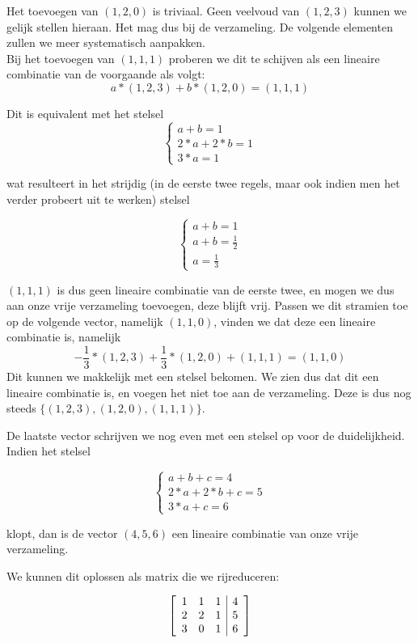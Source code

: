 \documentclass[lineaire_algebra_oplossingen.tex]{subfiles}
\begin{document}
Het toevoegen van $(1,2,0)$ is triviaal. Geen veelvoud van $(1,2,3)$ kunnen we gelijk stellen hieraan. Het mag dus bij de verzameling. De volgende elementen zullen we meer systematisch aanpakken.\\

Bij het toevoegen van $(1,1,1)$ proberen we dit te schijven als een lineaire combinatie van de voorgaande als volgt:\\
\[
a * (1,2,3) + b * (1,2,0) = (1,1,1)
\]

Dit is equivalent met het stelsel
\[
\left\{
\begin{array}{l}
a + b = 1\\
2*a + 2*b = 1\\
3*a = 1
\end{array} \right.
\]

wat resulteert in het strijdig (in de eerste twee regels, maar ook indien men het verder probeert uit te werken) stelsel

\[
\left\{
\begin{array}{l}
a + b = 1\\
a + b = \frac{1}{2}\\
a = \frac{1}{3}
\end{array} \right.
\]

$(1,1,1)$ is dus geen lineaire combinatie van de eerste twee, en mogen we dus aan onze vrije verzameling toevoegen, deze blijft vrij. Passen we dit stramien toe op de volgende vector, namelijk $(1,1,0)$, vinden we dat deze een lineaire combinatie is, namelijk
\[
-\frac{1}{3} * (1,2,3) + \frac{1}{3} * (1,2,0) + (1,1,1) = (1,1,0)
\]
Dit kunnen we makkelijk met een stelsel bekomen. We zien dus dat dit een lineaire combinatie is, en voegen het niet toe aan de verzameling. Deze is dus nog steeds $\{(1,2,3), (1,2,0), (1,1,1)\}$.

De laatste vector schrijven we nog even met een stelsel op voor de duidelijkheid. Indien het stelsel

\[
\left\{
\begin{array}{l}
a + b + c = 4\\
2*a + 2*b + c = 5\\
3*a + c = 6
\end{array} \right.
\]

klopt, dan is de vector $(4,5,6)$ een lineaire combinatie van onze vrije verzameling.

We kunnen dit oplossen als matrix die we rijreduceren:

\[
\left[
\begin{array}{c c c | c}
1 & 1 & 1 & 4\\
2 & 2 & 1 & 5\\
3 & 0 & 1 & 6
\end{array}
\right]
\]
\end{document}

